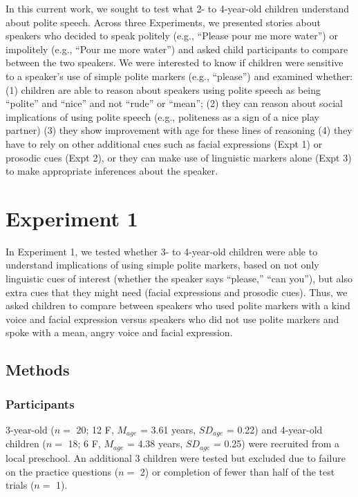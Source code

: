 \documentclass[10pt, letterpaper]{article}
\begin{document}
In this current work, we sought to test what 2- to 4-year-old children
understand about polite speech. Across three Experiments, we presented
stories about speakers who decided to speak politely (e.g., ``Please
pour me more water'') or impolitely (e.g., ``Pour me more water'') and
asked child participants to compare between the two speakers. We were
interested to know if children were sensitive to a speaker's use of
simple polite markers (e.g., ``please'') and examined whether: (1)
children are able to reason about speakers using polite speech as being
``polite'' and ``nice'' and not ``rude'' or ``mean''; (2) they can
reason about social implications of using polite speech (e.g.,
politeness as a sign of a nice play partner) (3) they show improvement
with age for these lines of reasoning (4) they have to rely on other
additional cues such as facial expressions (Expt 1) or prosodic cues
(Expt 2), or they can make use of linguistic markers alone (Expt 3) to
make appropriate inferences about the speaker.

\section{Experiment 1}\label{experiment-1}

In Experiment 1, we tested whether 3- to 4-year-old children were able
to understand implications of using simple polite markers, based on not
only linguistic cues of interest (whether the speaker says ``please,''
``can you''), but also extra cues that they might need (facial
expressions and prosodic cues). Thus, we asked children to compare
between speakers who used polite markers with a kind voice and facial
expression versus speakers who did not use polite markers and spoke with
a mean, angry voice and facial expression.

\subsection{Methods}\label{methods}

\subsubsection{Participants}\label{participants}

3-year-old (\(n=\) 20; 12 F, \(M_{age}\) = 3.61 years, \(SD_{age}\) =
0.22) and 4-year-old children (\(n=\) 18; 6 F, \(M_{age}\) = 4.38 years,
\(SD_{age}\) = 0.25) were recruited from a local preschool. An
additional 3 children were tested but excluded due to failure on the
practice questions (\(n=\) 2) or completion of fewer than half of the
test trials (\(n=\) 1).
\end{document}
